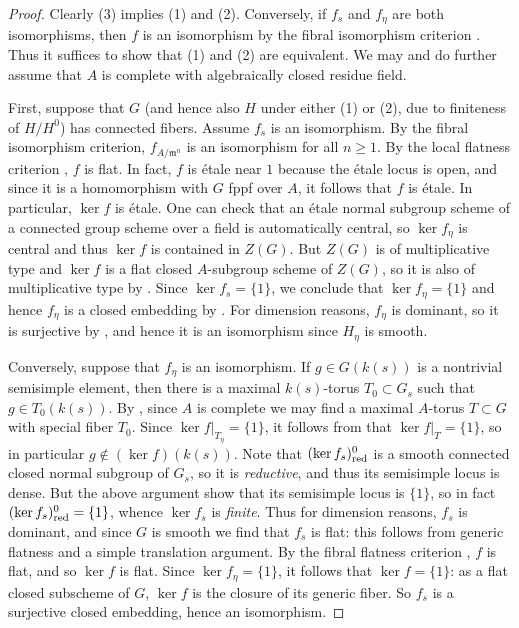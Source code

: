 \documentclass[11pt, letterpaper,english]{amsart}
\theoremstyle{plain}
\theoremstyle{definition}
\numberwithin{equation}{section}
\numberwithin{lem}{section}
\newcommand{\fm}{\mathfrak{m}}
\begin{document}
\begin{proof}
Clearly (3) implies (1) and (2). Conversely, if $f_s$ and $f_\eta$ are both isomorphisms, then $f$ is an isomorphism by the fibral isomorphism criterion \cite[IV\textsubscript{4}, Corollaire 17.9.5]{EGA}. Thus it suffices to show that (1) and (2) are equivalent. We may and do further assume that $A$ is complete with algebraically closed residue field. 

First, suppose that $G$ (and hence also $H$ under either (1) or (2), due to finiteness of $H/H^0$) has connected fibers. Assume $f_s$ is an isomorphism. By the fibral isomorphism criterion, $f_{A/\fm^n}$ is an isomorphism for all $n \geq 1$. By the local flatness criterion \cite[Theorem 22.3]{Matsumura}, $f$ is flat. In fact, $f$ is \'{e}tale near $1$ because the \'{e}tale locus is open, and since it is a homomorphism with $G$ fppf over $A$, it follows that $f$ is \'{e}tale. In particular, $\ker f$ is \'{e}tale. One can check that an \'{e}tale normal subgroup scheme of a connected group scheme over a field is automatically central, so $\ker f_\eta$ is central and thus $\ker f$ is contained in $Z(G)$. But $Z(G)$ is of multiplicative type and $\ker f$ is a flat closed $A$-subgroup scheme of $Z(G)$, so it is also of multiplicative type by \cite[Corollary B.3.3]{conrad}. Since $\ker f_s = \{1\}$, we conclude that $\ker f_\eta = \{1\}$ and hence $f_\eta$ is a closed embedding by \cite[Exp.\ VI\textsubscript{B}, Corollaire 1.4.2]{sga3}. For dimension reasons, $f_\eta$ is dominant, so it is surjective by \cite[Exp.\ VI\textsubscript{B}, Proposition 1.2]{sga3}, and hence it is an isomorphism since $H_\eta$ is smooth.

Conversely, suppose that $f_\eta$ is an isomorphism. If $g \in G(k(s))$ is a nontrivial semisimple element, then there is a maximal $k(s)$-torus $T_0 \subset G_s$ such that $g \in T_0(k(s))$. By \cite[Exp.\ IX, Th\'eor\`eme 3.6]{sga3}, since $A$ is complete we may find a maximal $A$-torus $T \subset G$ with special fiber $T_0$. Since $\ker f|_{T_\eta} = \{1\}$, it follows from \cite[Exp.\ IX, Th\'eor\`eme 6.8]{sga3} that $\ker f|_T = \{1\}$, so in particular $g \not\in (\ker f)(k(s))$. 
Note that $(\ker f_s)^0_{\rm{red}}$ is a smooth connected closed normal subgroup of $G_s$, so it is \textit{reductive}, and thus its semisimple locus is dense. But the above argument show that its semisimple locus is $\{1\}$, so in fact $(\ker f_s)^0_{\rm{red}} = \{1\}$, whence $\ker f_s$ is \textit{finite}. Thus for dimension reasons, $f_s$ is dominant, and since $G$ is smooth we find that $f_s$ is flat: this follows from generic flatness and a simple translation argument. By the fibral flatness criterion \cite[IV\textsubscript{3}, Th\'eor\`eme 11.3.10]{EGA}, $f$ is flat, and so $\ker f$ is flat. Since $\ker f_\eta = \{1\}$, it follows that $\ker f = \{1\}$: as a flat closed subscheme of $G$, $\ker f$ is the closure of its generic fiber. So $f_s$ is a surjective closed embedding, hence an isomorphism.


\end{proof}
\end{document}
